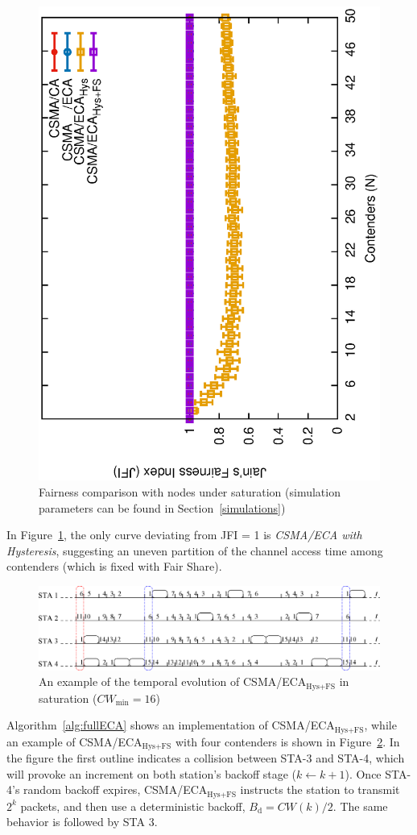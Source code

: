 	\begin{figure}[tb]
	\centering
		\includegraphics[width=0.7\linewidth, angle=-90]{figures/fairness-combined/fairness-combined-TON.eps}
		\caption{Fairness comparison with nodes under saturation (simulation parameters can be found in Section~\ref{simulations})}
		\label{fig:fairness}
	\end{figure}
	
	In Figure~\ref{fig:fairness}, the only curve deviating from JFI = 1 is \emph{CSMA/ECA with Hysteresis}, suggesting an uneven partition of the channel access time among contenders (which is fixed with Fair Share).
	
	\begin{figure}[tb]
	\centering
		\includegraphics[width=0.8\linewidth]{figures/csma_eca_different_backoff_short.eps}
		\caption{An example of the temporal evolution of CSMA/ECA$_{\text{Hys+FS}}$ in saturation ($CW_{\min}=16$)}
		\label{fig:ECA+Hyst}
	\end{figure}
	
	Algorithm~\ref{alg:fullECA} shows an implementation of CSMA/ECA$_{\text{Hys+FS}}$, while an example of CSMA/ECA$_{\text{Hys+FS}}$ with four contenders is shown in  Figure~\ref{fig:ECA+Hyst}. In the figure the first outline indicates a collision between STA-3 and STA-4, which will provoke an increment on both station's backoff stage ($k\leftarrow k+1$). Once STA-4's random backoff expires, CSMA/ECA$_{\text{Hys+FS}}$ instructs the station to transmit $2^{k}$ packets, and then use a deterministic backoff, $B_{\text{d}}=CW(k)/2$. The same behavior is followed by STA 3.
	
